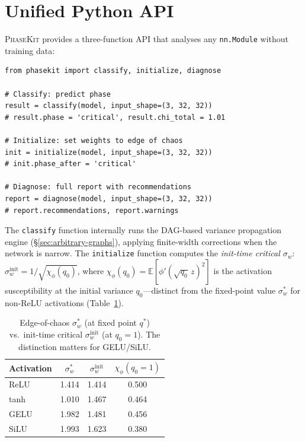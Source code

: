 \documentclass[10pt]{article}
\newcommand{\EE}{\mathbb{E}}
\newcommand{\ToolName}{\textsc{PhaseKit}}
\begin{document}
\section{Unified Python API}
\label{sec:api}

\ToolName{} provides a three-function API that analyses any \texttt{nn.Module} without training data:

\begin{verbatim}
from phasekit import classify, initialize, diagnose

# Classify: predict phase
result = classify(model, input_shape=(3, 32, 32))
# result.phase = 'critical', result.chi_total = 1.01

# Initialize: set weights to edge of chaos
init = initialize(model, input_shape=(3, 32, 32))
# init.phase_after = 'critical'

# Diagnose: full report with recommendations
report = diagnose(model, input_shape=(3, 32, 32))
# report.recommendations, report.warnings
\end{verbatim}

\noindent The \texttt{classify} function internally runs the DAG-based variance propagation engine (\S\ref{sec:arbitrary-graphs}), applying finite-width corrections when the network is narrow.
The \texttt{initialize} function computes the \emph{init-time critical $\sigma_w$}: $\sigma_w^{\text{init}} = 1/\sqrt{\chi_\phi(q_0)}$, where $\chi_\phi(q_0) = \EE[\phi'(\sqrt{q_0}\,z)^2]$ is the activation susceptibility at the initial variance $q_0$---distinct from the fixed-point value $\sigma_w^*$ for non-ReLU activations (Table~\ref{tab:init-sigma}).

\begin{table}[t]
\centering
\caption{Edge-of-chaos $\sigma_w^*$ (at fixed point $q^*$) vs.\ init-time critical $\sigma_w^{\text{init}}$ (at $q_0 = 1$). The distinction matters for GELU/SiLU.}
\label{tab:init-sigma}
\small
\begin{tabular}{@{}lccc@{}}
\toprule
\textbf{Activation} & $\sigma_w^*$ & $\sigma_w^{\text{init}}$ & \textbf{$\chi_\phi(q_0\!=\!1)$} \\
\midrule
ReLU & 1.414 & 1.414 & 0.500 \\
tanh & 1.010 & 1.467 & 0.464 \\
GELU & 1.982 & 1.481 & 0.456 \\
SiLU & 1.993 & 1.623 & 0.380 \\
\bottomrule
\end{tabular}
\end{table}
\end{document}
